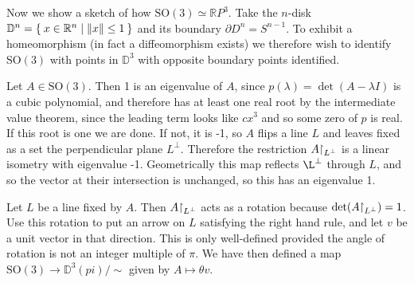 Now we show a sketch of how $\mathrm{SO}(3) \simeq \mathbb{R}P^3$.
Take the $n$-disk
$\mathbb{D}^n = \Set{ x \in \mathbb{R}^n | \| x \| \leq 1 }$ and its
boundary $\partial D^n = S^{n-1}$. To exhibit a homeomorphism (in fact
a diffeomorphism exists) we therefore wish to identify
$\mathrm{SO}(3)$ with points in $\mathbb{D}^3$ with opposite boundary
points identified.

Let $A \in \mathrm{SO}(3)$. Then 1 is an eigenvalue of $A$, since
$p(\lambda) = \det(A - \lambda I)$ is a cubic polynomial, and
therefore has at least one real root by the intermediate value
theorem, since the leading term looks like $cx^3$ and so some zero of
$p$ is real. If this root is one we are done. If not, it is -1, so
$A$ flips a line $L$ and leaves fixed as a set the perpendicular plane
$L^\perp$. Therefore the restriction $A\mathord{\upharpoonright}_{L^\perp}$ is a
linear isometry with eigenvalue -1. Geometrically this map reflects
$\L^\perp$ through $L$, and so the vector at their intersection is
unchanged, so this has an eigenvalue 1.

Let $L$ be a line fixed by $A$. Then $A\mathord{\upharpoonright}_{L^\perp}$ acts as a
rotation because $\det(A\mathord{\upharpoonright}_{L^\perp}) = 1$. Use this rotation
to put an arrow on $L$ satisfying the right hand rule, and let $v$ be
a unit vector in that direction. This is only well-defined provided
the angle of rotation is not an integer multiple of $\pi$. We have
then defined a map $\mathrm{SO}(3) \to \mathbb{D}^3(pi) / \sim$ given
by
$A \mapsto \theta v$.
